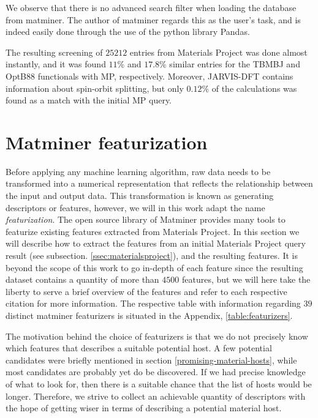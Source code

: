 We observe that there is no advanced search filter when loading the database from matminer. The author of matminer regards this as the user's task, and is indeed easily done through the use of the python library Pandas.

The resulting screening of $25212$ entries from Materials Project was done almost instantly, and it was found $11$\% and $17.8$\% similar entries for the TBMBJ and OptB88 functionals with MP, respectively. Moreover, JARVIS-DFT contains information about spin-orbit splitting, but only $0.12\%$ of the calculations was found as a match with the initial MP query.

\section{Matminer featurization}

Before applying any machine learning algorithm, raw data needs to be transformed into a numerical representation that reflects the relationship between the input and output data. This transformation is known as generating descriptors or features, however, we will in this work adapt the name \textit{featurization}. The open source library of Matminer provides many tools to featurize existing features extracted from Materials Project. In this section we will describe how to extract the features from an initial Materials Project query result (see subsection. \autoref{ssec:materialsproject}), and the resulting features. It is beyond the scope of this work to go in-depth of each feature since the resulting dataset contains a quantity of more than $4500$ features, but we will here take the liberty to serve a brief overview of the features and refer to each respective citation for more information. The respective table with information regarding $39$ distinct matminer featurizers is situated in the Appendix, \autoref{table:featurizers}.

The motivation behind the choice of featurizers is that we do not precisely know which features that describes a suitable potential host. A few potential candidates were briefly mentioned in section \autoref{promising-material-hosts}, while most candidates are probably yet do be discovered. If we  had precise knowledge of what to look for, then there is a suitable chance that the list of hosts would be longer. Therefore, we strive to collect an achievable quantity of descriptors with the hope of getting wiser in terms of describing a potential material host.

